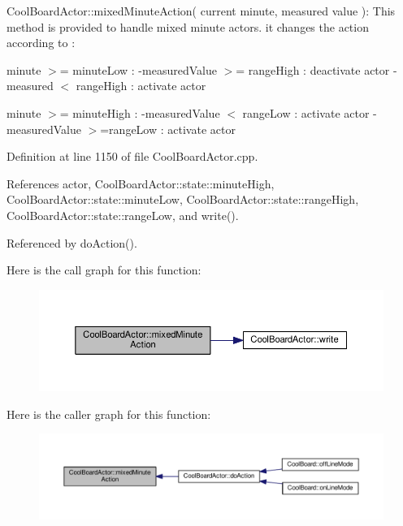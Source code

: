 Cool\+Board\+Actor\+::mixed\+Minute\+Action( current minute, measured value )\+: This method is provided to handle mixed minute actors. it changes the action according to \+:

minute $>$= minute\+Low \+: -\/measured\+Value $>$= range\+High \+: deactivate actor -\/measured $<$ range\+High \+: activate actor

minute $>$= minute\+High \+: -\/measured\+Value $<$ range\+Low \+: activate actor -\/measured\+Value $>$=range\+Low \+: activate actor 

Definition at line 1150 of file Cool\+Board\+Actor.\+cpp.



References actor, Cool\+Board\+Actor\+::state\+::minute\+High, Cool\+Board\+Actor\+::state\+::minute\+Low, Cool\+Board\+Actor\+::state\+::range\+High, Cool\+Board\+Actor\+::state\+::range\+Low, and write().



Referenced by do\+Action().

Here is the call graph for this function\+:
\nopagebreak
\begin{figure}[H]
\begin{center}
\leavevmode
\includegraphics[width=350pt]{dc/d69/class_cool_board_actor_a2b8a79a27288d5246e3e3860ae76770d_cgraph}
\end{center}
\end{figure}
Here is the caller graph for this function\+:
\nopagebreak
\begin{figure}[H]
\begin{center}
\leavevmode
\includegraphics[width=350pt]{dc/d69/class_cool_board_actor_a2b8a79a27288d5246e3e3860ae76770d_icgraph}
\end{center}
\end{figure}
\mbox{\label{class_cool_board_actor_a1eb1fbca19bc80aad20d2686d52317f8}} 

